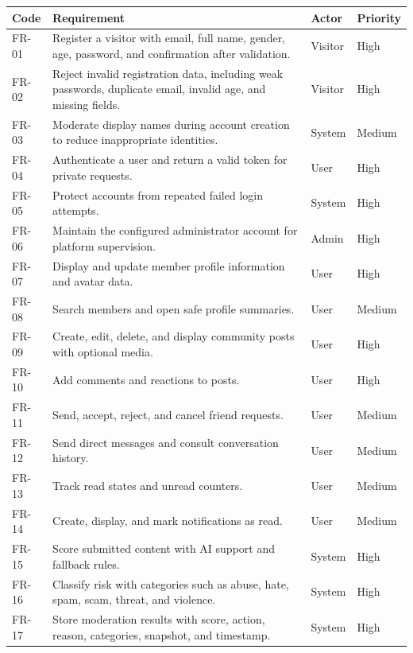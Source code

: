 \begin{longtable}{|m{1.8cm}|m{8.6cm}|m{2.4cm}|m{1.8cm}|}
\hline
\textbf{Code} & \textbf{Requirement} & \textbf{Actor} & \textbf{Priority} \\
\hline
FR-01 & Register a visitor with email, full name, gender, age, password, and confirmation after validation. & Visitor & High \\
\hline
FR-02 & Reject invalid registration data, including weak passwords, duplicate email, invalid age, and missing fields. & Visitor & High \\
\hline
FR-03 & Moderate display names during account creation to reduce inappropriate identities. & System & Medium \\
\hline
FR-04 & Authenticate a user and return a valid token for private requests. & User & High \\
\hline
FR-05 & Protect accounts from repeated failed login attempts. & System & High \\
\hline
FR-06 & Maintain the configured administrator account for platform supervision. & Admin & High \\
\hline
FR-07 & Display and update member profile information and avatar data. & User & High \\
\hline
FR-08 & Search members and open safe profile summaries. & User & Medium \\
\hline
FR-09 & Create, edit, delete, and display community posts with optional media. & User & High \\
\hline
FR-10 & Add comments and reactions to posts. & User & High \\
\hline
FR-11 & Send, accept, reject, and cancel friend requests. & User & Medium \\
\hline
FR-12 & Send direct messages and consult conversation history. & User & Medium \\
\hline
FR-13 & Track read states and unread counters. & User & Medium \\
\hline
FR-14 & Create, display, and mark notifications as read. & User & Medium \\
\hline
FR-15 & Score submitted content with AI support and fallback rules. & System & High \\
\hline
FR-16 & Classify risk with categories such as abuse, hate, spam, scam, threat, and violence. & System & High \\
\hline
FR-17 & Store moderation results with score, action, reason, categories, snapshot, and timestamp. & System & High \\

\end{longtable}
